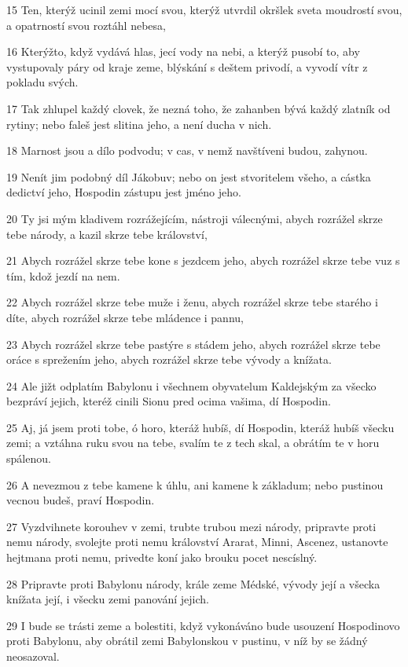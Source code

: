 \par 15 Ten, kterýž ucinil zemi mocí svou, kterýž utvrdil okršlek sveta moudrostí svou, a opatrností svou roztáhl nebesa,
\par 16 Kterýžto, když vydává hlas, jecí vody na nebi, a kterýž pusobí to, aby vystupovaly páry od kraje zeme, blýskání s deštem privodí, a vyvodí vítr z pokladu svých.
\par 17 Tak zhlupel každý clovek, že nezná toho, že zahanben bývá každý zlatník od rytiny; nebo faleš jest slitina jeho, a není ducha v nich.
\par 18 Marnost jsou a dílo podvodu; v cas, v nemž navštíveni budou, zahynou.
\par 19 Nenít jim podobný díl Jákobuv; nebo on jest stvoritelem všeho, a cástka dedictví jeho, Hospodin zástupu jest jméno jeho.
\par 20 Ty jsi mým kladivem rozrážejícím, nástroji válecnými, abych rozrážel skrze tebe národy, a kazil skrze tebe království,
\par 21 Abych rozrážel skrze tebe kone s jezdcem jeho, abych rozrážel skrze tebe vuz s tím, kdož jezdí na nem.
\par 22 Abych rozrážel skrze tebe muže i ženu, abych rozrážel skrze tebe starého i díte, abych rozrážel skrze tebe mládence i pannu,
\par 23 Abych rozrážel skrze tebe pastýre s stádem jeho, abych rozrážel skrze tebe oráce s sprežením jeho, abych rozrážel skrze tebe vývody a knížata.
\par 24 Ale jižt odplatím Babylonu i všechnem obyvatelum Kaldejským za všecko bezpráví jejich, kteréž cinili Sionu pred ocima vašima, dí Hospodin.
\par 25 Aj, já jsem proti tobe, ó horo, kteráž hubíš, dí Hospodin, kteráž hubíš všecku zemi; a vztáhna ruku svou na tebe, svalím te z tech skal, a obrátím te v horu spálenou.
\par 26 A nevezmou z tebe kamene k úhlu, ani kamene k základum; nebo pustinou vecnou budeš, praví Hospodin.
\par 27 Vyzdvihnete korouhev v zemi, trubte trubou mezi národy, pripravte proti nemu národy, svolejte proti nemu království Ararat, Minni, Ascenez, ustanovte hejtmana proti nemu, privedte koní jako brouku pocet nescíslný.
\par 28 Pripravte proti Babylonu národy, krále zeme Médské, vývody její a všecka knížata její, i všecku zemi panování jejich.
\par 29 I bude se trásti zeme a bolestiti, když vykonáváno bude usouzení Hospodinovo proti Babylonu, aby obrátil zemi Babylonskou v pustinu, v níž by se žádný neosazoval.
